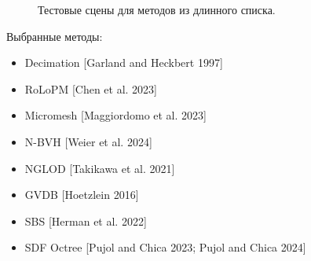 \documentclass[a4paper,hidelinks,12pt]{article}
\begin{document}
\begin{figure}[h]
  \centering
  \caption{}
  \label{fig:my_label}
\end{figure}

\newpage

\begin{figure}[h]
  \centering
  \caption{Тестовые сцены для методов из длинного списка.}
  \label{fig:my_label}
\end{figure}

Выбранные методы:

\begin{itemize}
	\item Decimation [Garland and Heckbert 1997]
	\item RoLoPM [Chen et al. 2023]
	\item Micromesh [Maggiordomo et al. 2023]
	\item N-BVH [Weier et al. 2024]
	\item NGLOD [Takikawa et al. 2021]
	\item GVDB [Hoetzlein 2016]
	\item SBS [Herman et al. 2022]
	\item SDF Octree [Pujol and Chica 2023; Pujol and Chica 2024]
\end{itemize}
\end{document}
